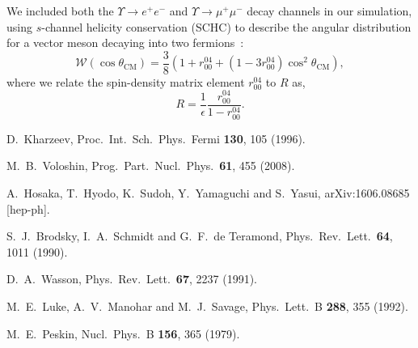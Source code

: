 \documentclass[prd,amsmath,%
twocolumn,floatfix,amssymb, preprintnumbers, linenumbers,nofootinbib, superscriptaddress]{revtex4}
\newcommand{\beq}{\begin{equation}}
\newcommand{\eeq}{\end{equation}}
\begin{document}
We included both the $\Upsilon \to e^+e^-$ and $\Upsilon \to \mu^+\mu^-$ decay channels
in our simulation, using $s$-channel helicity conservation (SCHC) to describe the
angular distribution for a vector meson decaying into two fermions~\cite{Breitweg:1998nh,Chekanov:2002xi,Schilling:1973ag}:
\beq
\mathcal{W}(\cos\theta_\text{CM}) = 
\frac{3}{8}(1+r^{04}_{00}+(1-3r_{00}^{04})\cos^2\theta_\text{CM}),
\eeq
where we relate the spin-density matrix element $r^{04}_{00}$ to $R$ as,
\beq
R = \frac{1}{\epsilon}\frac{r^{04}_{00}}{1-r^{04}_{00}}.
\eeq


\begin{thebibliography}{99}

  D.~Kharzeev,
  Proc.\ Int.\ Sch.\ Phys.\ Fermi {\bf 130}, 105 (1996).

  M.~B.~Voloshin,
  Prog.\ Part.\ Nucl.\ Phys.\  {\bf 61}, 455 (2008).
  
  A.~Hosaka, T.~Hyodo, K.~Sudoh, Y.~Yamaguchi and S.~Yasui,
  arXiv:1606.08685 [hep-ph].

  S.~J.~Brodsky, I.~A.~Schmidt and G.~F.~de Teramond,
  Phys.\ Rev.\ Lett.\  {\bf 64}, 1011 (1990).
  
  D.~A.~Wasson,
  Phys.\ Rev.\ Lett.\  {\bf 67}, 2237 (1991).
  
  M.~E.~Luke, A.~V.~Manohar and M.~J.~Savage,
  Phys.\ Lett.\ B {\bf 288}, 355 (1992). 

  M.~E.~Peskin,
  Nucl.\ Phys.\ B {\bf 156}, 365 (1979).


\end{thebibliography}
\end{document}
